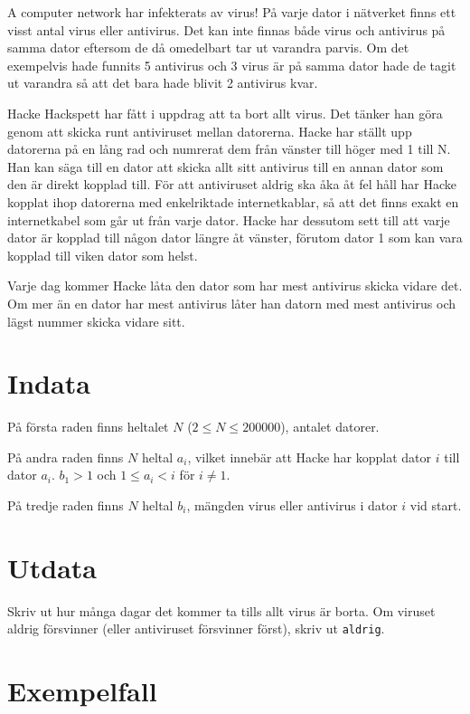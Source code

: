 
A computer network har infekterats av virus! På varje dator i nätverket finns ett visst antal virus eller antivirus. Det kan inte finnas både virus och antivirus på samma dator eftersom de då omedelbart tar ut varandra parvis. Om det exempelvis hade funnits 5 antivirus och 3 virus är på samma dator hade de tagit ut varandra så att det bara hade blivit 2 antivirus kvar.

Hacke Hackspett har fått i uppdrag att ta bort allt virus. Det tänker han göra genom att skicka runt antiviruset mellan datorerna. Hacke har ställt upp datorerna på en lång rad och numrerat dem från vänster till höger med 1 till N. Han kan säga till en dator att skicka allt sitt antivirus till en annan dator som den är direkt kopplad till. För att antiviruset aldrig ska åka åt fel håll har Hacke kopplat ihop datorerna med enkelriktade internetkablar, så att det finns exakt en internetkabel som går ut från varje dator. Hacke har dessutom sett till att varje dator är kopplad till någon dator längre åt vänster, förutom dator 1 som kan vara kopplad till viken dator som helst.

Varje dag kommer Hacke låta den dator som har mest antivirus skicka vidare det. Om mer än en dator har mest antivirus låter han datorn med mest antivirus och lägst nummer skicka vidare sitt.

\section*{Indata}
På första raden finns heltalet $N$ ($2 \leq N \leq 200000$), antalet datorer.

På andra raden finns $N$ heltal $a_i$, vilket innebär att Hacke har kopplat dator $i$ till dator $a_i$. $b_1 > 1$ och $1 \leq a_i < i$ för $i \neq 1$.

På tredje raden finns $N$ heltal $b_i$, mängden virus eller antivirus i dator $i$ vid start.

\section*{Utdata}
Skriv ut hur många dagar det kommer ta tills allt virus är borta. Om viruset aldrig försvinner (eller antiviruset försvinner först), skriv ut \texttt{aldrig}.

\section*{Exempelfall}

